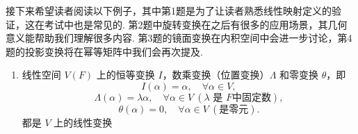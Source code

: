 接下来希望读者阅读以下例子，其中第1题是为了让读者熟悉线性映射定义的验证，这在考试中也是常见的. 第2题中旋转变换在之后有很多的应用场景，其几何意义能帮助我们理解很多内容. 第3题的镜面变换在内积空间中会进一步讨论，第4题的投影变换将在幂等矩阵中我们会再次提及.


\begin{example}{}{}
    \begin{enumerate}
        \item
        线性空间 $V(F)$ 上的恒等变换 $I$，数乘变换（位置变换）$\Lambda$ 和零变换 $\theta$，即
        \[
        I(\alpha) = \alpha,\quad \forall \alpha \in V,
        \]
        \[
        \Lambda(\alpha) = \lambda \alpha, \quad \forall \alpha \in V\ ( \lambda \text{ 是 } F \text{中固定数} ),
        \]
        \[
        \theta(\alpha) = 0, \quad \forall \alpha \in V\ (\text{是零元}).
        \]
        都是 $V$ 上的线性变换


\end{enumerate}
\end{example}
